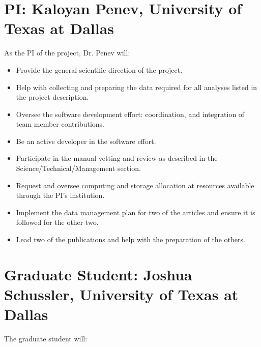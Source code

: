 \section*{}

\vspace{5mm}

\section*{PI: Kaloyan Penev, University of Texas at Dallas}

As the PI of the project, Dr. Penev will:

\begin{itemize}
%
    \item Provide the general scientific direction of the project.
%
    \item Help with collecting and preparing the data required for all analyses
        listed in the project description.
%
    \item Oversee the software development effort: coordination, and integration
        of team member contributions.
%
    \item Be an active developer in the software effort.
%
    \item Participate in the manual vetting and review as described in the
        Science/Technical/Management section.
%
    \item Request and oversee computing and storage allocation at resources
        available through the PI’s institution.
%
    \item Implement the data management plan for two of the articles and
        ensure it is followed for the other two.
%
    \item Lead two of the publications and help with the preparation of the
        others.
%
\end{itemize}

\vspace{5mm}

\section*{Graduate Student: Joshua Schussler, University of Texas at Dallas}

The graduate student will:

